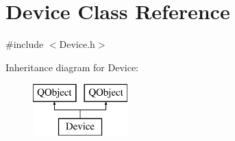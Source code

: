 \hypertarget{class_device}{\section{Device Class Reference}
\label{class_device}
}


{\ttfamily \#include $<$Device.\-h$>$}

Inheritance diagram for Device\-:\begin{figure}[H]
\begin{center}
\leavevmode
\includegraphics[height=2.000000cm]{class_device}
\end{center}
\end{figure}
